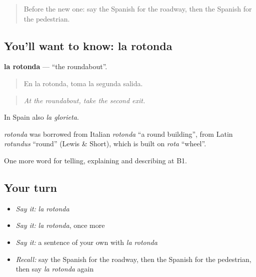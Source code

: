 \label{lesson:ES-C647-rotonda}



\begin{quote}
Before the new one: say the Spanish for the roadway, then the Spanish for the pedestrian.
\end{quote}

\subsection*{You'll want to know: la rotonda}
\textbf{la rotonda} — \textquotedblleft{}the roundabout\textquotedblright{}.

\begin{quote}
En la rotonda, toma la segunda salida.
\end{quote}

\begin{quote}
\emph{At the roundabout, take the second exit.}
\end{quote}

In Spain also \emph{la glorieta}.

\begin{cousinweb}
\emph{rotonda} was borrowed from Italian \emph{rotonda} \textquotedblleft{}a round building\textquotedblright{}, from Latin \emph{rotundus} \textquotedblleft{}round\textquotedblright{} (Lewis \& Short), which is built on \emph{rota} \textquotedblleft{}wheel\textquotedblright{}.
\end{cousinweb}

\begin{grammarlens}[title={What you've built}]
One more word for telling, explaining and describing at B1.
\end{grammarlens}

\subsection*{Your turn}
\begin{itemize}
\raggedright
  \item \emph{Say it:} \emph{la rotonda}
  \item \emph{Say it:} \emph{la rotonda}, once more
  \item \emph{Say it:} a sentence of your own with \emph{la rotonda}
  \item \emph{Recall:} say the Spanish for the roadway, then the Spanish for the pedestrian, then say \emph{la rotonda} again
\end{itemize}


